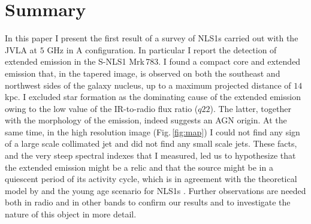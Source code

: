 \documentclass[../main.tex]{subfiles}
\begin{document}
\section{Summary}
\label{sec:summary}

In this paper I present the first result of a survey of NLS1s carried out with the JVLA at $5$ GHz in A configuration.
In particular I report the detection of extended emission in the S-NLS1 Mrk\,783.
I found a compact core and extended emission that, in the tapered image, is observed on both the southeast and northwest sides of the galaxy nucleus, up to a maximum projected distance of $14$ kpc.
I excluded star formation as the dominating cause of the extended emission owing to the low value of the IR-to-radio flux ratio ($q22$).
The latter, together with the morphology of the emission, indeed suggests an AGN origin.
At the same time, in the high resolution image (Fig.\,\ref{fig:map}) I could not find any sign of a large scale collimated jet and \citet{Doi13} did not find any small scale jets.
These facts, and the very steep spectral indexes that I measured, led us to hypothesize that the extended emission might be a relic and that the source might be in a quiescent period of its activity cycle, which is in agreement with the theoretical model by \citet{Czerny09} and the young age scenario for NLS1s \citep{Mathur00}. 
Further observations are needed both in radio and in other bands to confirm our results and to investigate the nature of this object  in more detail. 

\biblio
\end{document}
